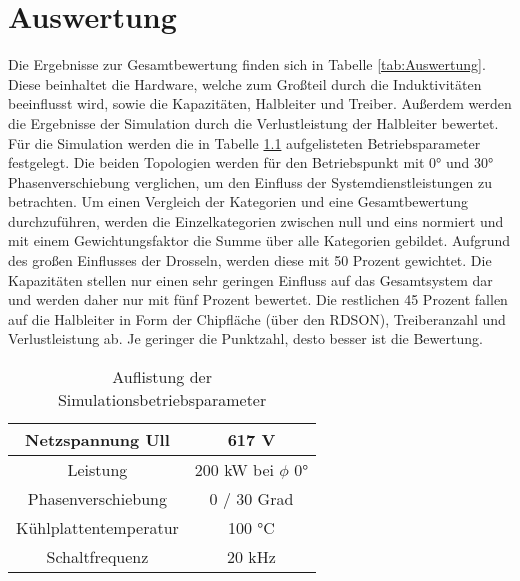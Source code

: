 \chapter{Auswertung}
Die Ergebnisse zur Gesamtbewertung finden sich in Tabelle \ref{tab:Auswertung}. Diese beinhaltet die Hardware, welche zum Großteil durch die Induktivitäten beeinflusst wird, sowie die Kapazitäten, Halbleiter und Treiber. Außerdem werden die Ergebnisse der Simulation durch die Verlustleistung der Halbleiter bewertet. Für die Simulation werden die in Tabelle \ref{tab:Betriebspara} aufgelisteten Betriebsparameter festgelegt. Die beiden Topologien werden für den Betriebspunkt mit 0° und 30° Phasenverschiebung verglichen, um den Einfluss der Systemdienstleistungen zu betrachten. Um einen Vergleich der Kategorien und eine Gesamtbewertung durchzuführen, werden die Einzelkategorien zwischen null und eins normiert und mit einem Gewichtungsfaktor die Summe über alle Kategorien gebildet. Aufgrund des großen Einflusses der Drosseln, werden diese mit 50 Prozent gewichtet. Die Kapazitäten stellen nur einen sehr geringen Einfluss auf das Gesamtsystem dar und werden daher nur mit fünf Prozent bewertet. Die restlichen 45 Prozent fallen auf die Halbleiter in Form der Chipfläche (über den \gls{RDSON}), Treiberanzahl und Verlustleistung ab. Je geringer die Punktzahl, desto besser ist die Bewertung. \\

	
\begin{table}
	\caption{Auflistung der Simulationsbetriebsparameter}
	\label{tab:Betriebspara}
	\centering
\begin{tabular}{|c|c|}
	\hline
	Netzspannung \gls{Ull} & 617 \si{\volt} \\
	\hline
	Leistung & 200 kW bei $\phi$ 0° \\
	\hline
	Phasenverschiebung & 0 / 30 Grad \\
	\hline
	Kühlplattentemperatur & 100 °C \\
	\hline
	Schaltfrequenz & 20 kHz \\
	\hline
\end{tabular}
\end{table}


